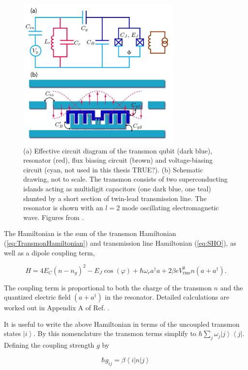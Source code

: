 \documentclass[11 pt, oneside]{book} %
\newcommand{\ket}[1]{\left| #1 \right>} %
\newcommand{\bra}[1]{\left< #1 \right|} %
\begin{document}
\begin{figure}[h] 
   \centering
   \includegraphics[height=3in]{KochTransmon.png} 
   \caption[Transmon circuit schematic]{(a) Effective circuit diagram of the transmon qubit (dark blue), resonator (red), flux biasing circuit (brown) and voltage-biasing circuit (cyan, not used in this thesis TRUE?). (b) Schematic drawing, not to scale. The transmon consists of two superconducting islands acting as multidigit capacitors (one dark blue, one teal) shunted by a short section of twin-lead transmission line. The resonator is shown with an $l=2$ mode oscillating electromagnetic wave. Figures from \cite{Koch}.}
   \label{fig:TransmonCoupling}
\end{figure}

The Hamiltonian is the sum of the transmon Hamiltonian (\ref{eq:TransmonHamiltonian}) and transmission line Hamiltonian (\ref{eq:SHO}), as well as a dipole coupling term,

\begin{equation}\label{eq:CQC}
H=4E_C(n-n_g)^2-E_J\cos(\varphi)+\hbar\omega_ra^{\dag}a+2\beta eV^0_{\mathrm{rms}}n(a+a^{\dag}).
\end{equation}

The coupling term is proportional to both the charge of the transmon $n$ and the quantized electric field $(a+a^{\dag})$ in the resonator. Detailed calculations are worked out in Appendix A of Ref. \cite{Koch}.

It is useful to write the above Hamiltonian in terms of the uncoupled transmon states $\ket{i}$. By this nomenclature the transmon terms simplify to $\hbar\sum_j\omega_j\ket{j}\bra{j}$. Defining the coupling strength $g$ by

\begin{equation}
\hbar g_{ij}=\beta\bra{i}n\ket{j}
\end{equation}
\end{document}

